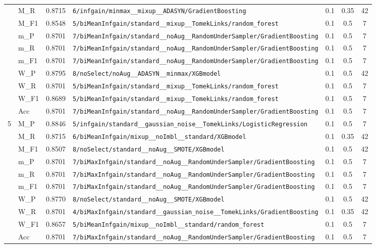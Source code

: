 \begin{table}[htbp]
\begin{tabular}{|c|l|c|>{\ttfamily\footnotesize}p{7.2cm}|c|c|c|}
 & M\_R & 0.8715 & \texttt{6/infgain/minmax\_\_mixup\_\_ADASYN/GradientBoosting} & 0.1 & 0.35  & 42 \\ 
 & M\_F1 & 0.8548 & \texttt{5/biMeanInfgain/standard\_\_mixup\_\_TomekLinks/random\_forest} & 0.1 & 0.5  & 7 \\ 
 & m\_P & 0.8701 & \texttt{7/biMeanInfgain/standard\_\_noAug\_\_RandomUnderSampler/GradientBoosting} & 0.1 & 0.5  & 7 \\ 
 & m\_R & 0.8701 & \texttt{7/biMeanInfgain/standard\_\_noAug\_\_RandomUnderSampler/GradientBoosting} & 0.1 & 0.5  & 7 \\ 
 & m\_F1 & 0.8701 & \texttt{7/biMeanInfgain/standard\_\_noAug\_\_RandomUnderSampler/GradientBoosting} & 0.1 & 0.5  & 7 \\ 
 & W\_P & 0.8795 & \texttt{8/noSelect/noAug\_\_ADASYN\_\_minmax/XGBmodel} & 0.1 & 0.5  & 42 \\ 
 & W\_R & 0.8701 & \texttt{5/biMeanInfgain/standard\_\_mixup\_\_TomekLinks/random\_forest} & 0.1 & 0.5  & 7 \\ 
 & W\_F1 & 0.8689 & \texttt{5/biMeanInfgain/standard\_\_mixup\_\_TomekLinks/random\_forest} & 0.1 & 0.5  & 7 \\ 
 & Acc & 0.8701 & \texttt{7/biMeanInfgain/standard\_\_noAug\_\_RandomUnderSampler/GradientBoosting} & 0.1 & 0.5  & 7 \\ 
\hline
\multirow{10}{*}{5} & M\_P & 0.8846 & \texttt{5/infgain/standard\_\_gaussian\_noise\_\_TomekLinks/LogisticRegression} & 0.1 & 0.5  & 7 \\ 
 & M\_R & 0.8715 & \texttt{6/biMeanInfgain/mixup\_\_noImbl\_\_standard/XGBmodel} & 0.1 & 0.35  & 42 \\ 
 & M\_F1 & 0.8507 & \texttt{8/noSelect/standard\_\_noAug\_\_SMOTE/XGBmodel} & 0.1 & 0.5  & 42 \\ 
 & m\_P & 0.8701 & \texttt{7/biMaxInfgain/standard\_\_noAug\_\_RandomUnderSampler/GradientBoosting} & 0.1 & 0.5  & 7 \\ 
 & m\_R & 0.8701 & \texttt{7/biMaxInfgain/standard\_\_noAug\_\_RandomUnderSampler/GradientBoosting} & 0.1 & 0.5  & 7 \\ 
 & m\_F1 & 0.8701 & \texttt{7/biMaxInfgain/standard\_\_noAug\_\_RandomUnderSampler/GradientBoosting} & 0.1 & 0.5  & 7 \\ 
 & W\_P & 0.8770 & \texttt{8/noSelect/standard\_\_noAug\_\_SMOTE/XGBmodel} & 0.1 & 0.5  & 42 \\ 
 & W\_R & 0.8701 & \texttt{4/biMaxInfgain/standard\_\_gaussian\_noise\_\_TomekLinks/GradientBoosting} & 0.1 & 0.35  & 42 \\ 
 & W\_F1 & 0.8657 & \texttt{5/biMeanInfgain/mixup\_\_noImbl\_\_standard/random\_forest} & 0.1 & 0.5  & 7 \\ 
 & Acc & 0.8701 & \texttt{7/biMaxInfgain/standard\_\_noAug\_\_RandomUnderSampler/GradientBoosting} & 0.1 & 0.5  & 7 \\ 
\hline
\end{tabular}
\end{table}